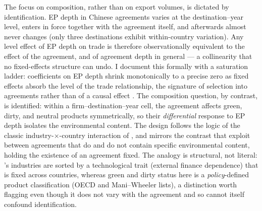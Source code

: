 \documentclass[12pt]{article}
\begin{document}
The focus on composition, rather than on export volumes, is dictated by identification.
EP depth in Chinese agreements varies at the destination--year level, enters in force
together with the agreement itself, and afterwards almost never changes (only three
destinations exhibit within-country variation). Any level effect of EP depth on trade is
therefore observationally equivalent to the effect of the agreement, and of agreement
depth in general --- a collinearity that no fixed-effects structure can undo. I document
this formally with a saturation ladder: coefficients on EP depth shrink monotonically to
a precise zero as fixed effects absorb the level of the trade relationship, the signature
of selection into agreements rather than of a causal effect
\citep{bertrand2004, abadie2023}. The composition question, by contrast, is identified:
within a firm--destination--year cell, the agreement affects green, dirty, and neutral
products symmetrically, so their \emph{differential} response to EP depth isolates the
environmental content. The design follows the logic of the classic
industry-$\times$-country interaction of \citet{rajan1998}, and mirrors the contrast that
\citet{abman2024} exploit between agreements that do and do not contain specific
environmental content, holding the existence of an agreement fixed. The analogy is structural, not literal: \citeauthor{rajan1998}'s industries are
sorted by a technological trait (external finance dependence) that is fixed across
countries, whereas green and dirty status here is a \emph{policy}-defined product
classification (OECD and Mani--Wheeler lists), a distinction worth flagging even though
it does not vary with the agreement and so cannot itself confound identification.
\end{document}
